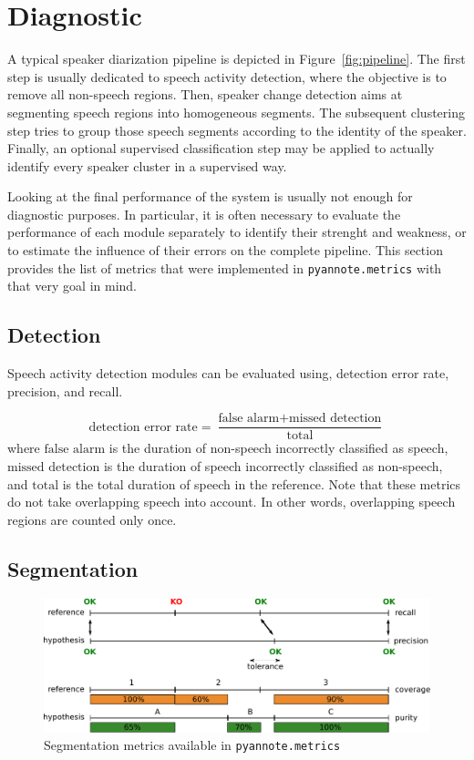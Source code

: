 \documentclass[a4paper]{article}
\newcommand*\metrics{\texttt{\footnotesize{pyannote.metrics}}}
\begin{document}
\section{Diagnostic}
\label{sec:diagnostic}

A typical speaker diarization pipeline is depicted in Figure~\ref{fig:pipeline}.
The first step is usually dedicated to speech activity detection, where the objective is to remove all non-speech regions.
Then, speaker change detection aims at segmenting speech regions into homogeneous segments.
The subsequent clustering step tries to group those speech segments according to the identity of the speaker.
Finally, an optional supervised classification step may be applied to actually identify every speaker cluster in a supervised way.

Looking at the final performance of the system is usually not enough for diagnostic purposes.
In particular, it is often necessary to evaluate the performance of each module separately to identify their strenght and weakness, or to estimate the influence of their errors on the complete pipeline.
This section provides the list of metrics that were implemented in \metrics{} with that very goal in mind.

\subsection{Detection}

Speech activity detection modules can be evaluated using, detection error rate, precision, and recall.

\begin{equation*}
  \text{detection error rate} = \frac{\text{false alarm} + \text{missed detection}}{\text{total}}
\end{equation*}
where $\text{false alarm}$ is the duration of non-speech incorrectly classified as speech, $\text{missed detection}$ is the duration of
speech incorrectly classified as non-speech, and $\text{total}$ is the total duration of speech in the reference.
Note that these metrics do not take overlapping speech into account.
In other words, overlapping speech regions are counted only once.

\subsection{Segmentation}

\begin{figure}[htb]
  \centering
  \includegraphics[width=1.0\linewidth]{figures/segmentation.pdf}
  \caption{Segmentation metrics available in \metrics{}}
  \label{fig:segmentation}
\end{figure}
\end{document}
